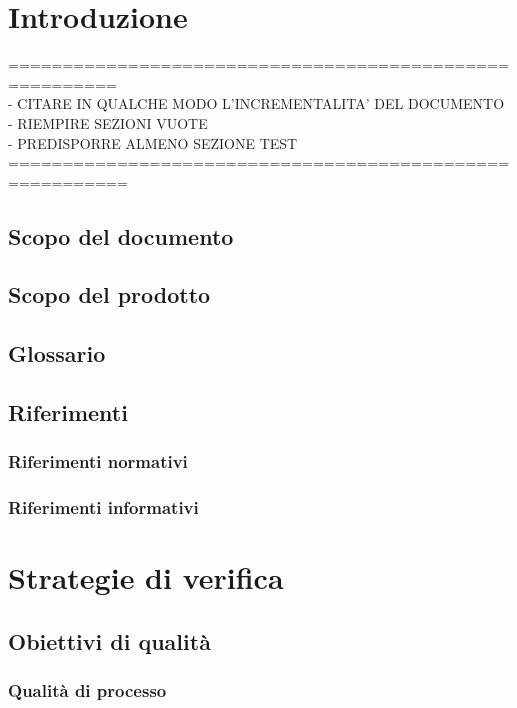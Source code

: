 \documentclass[a4paper, oneside, openany, dvipsnames, table]{article}
\begin{document}
\copertina{}

\newpage
\tableofcontents
\newpage
\section{Introduzione}
========================================================\\
- CITARE IN QUALCHE MODO L'INCREMENTALITA' DEL DOCUMENTO\\
- RIEMPIRE SEZIONI VUOTE\\
- PREDISPORRE ALMENO SEZIONE TEST\\
=========================================================\\
	\subsection{Scopo del documento}
		
	\subsection{Scopo del prodotto}
		
	\subsection{Glossario}
		
	\subsection{Riferimenti}
		\subsubsection{Riferimenti normativi}
			
		\subsubsection{Riferimenti informativi}
			
	\newpage
\section{Strategie di verifica}
	
	\subsection{Obiettivi di qualità}
		\subsubsection{Qualità di processo}
			
\end{document}
